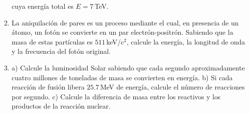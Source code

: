 \documentclass[a4paper,12pt]{article}
\begin{document}
\begin{enumerate}
		cuya energía total es $E=7$\,TeV.
	\item La aniquilación de pares es un proceso mediante el cual, en presencia
		de un átomo, un fotón se convierte en un par electrón-positrón.
		Sabiendo que la masa de estas partículas es $511$\,keV/c$^2$, calcule
		la energía, la longitud de onda y la frecuencia del fotón original.
	\item a) Calcule la luminosidad Solar sabiendo que cada segundo
		aproximadamente cuatro millones de toneladas de masa se convierten en
		energía. b) Si cada reacción de fusión libera $25.7$\,MeV de energía,
		calcule el número de reacciones por segundo. c) Calcule la diferencia
		de masa entre los reactivos y los productos de la reacción nuclear.  
\end{enumerate}
\end{document}
